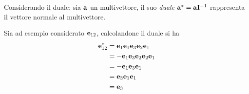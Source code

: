\begin{frame}
    Considerando il duale: sia \(\mathbf{a}\) un multivettore, 
    il suo \emph{duale} \(\mathbf{a}^{*} = \mathbf{a}\mathbf{I}^{-1}\) rappresenta il vettore normale al multivettore.

    Sia ad esempio considerato \(\mathbf{e}_{12}\), calcolandone il duale si ha
    \[\begin{aligned}
        \mathbf{e}_{12}^{*} & = \mathbf{e}_{1}\mathbf{e}_{1}\mathbf{e}_{3}\mathbf{e}_{2}\mathbf{e}_{1} \\ 
            & = - \mathbf{e}_{1}\mathbf{e}_{3}\mathbf{e}_{2}\mathbf{e}_{2}\mathbf{e}_{1} \\ 
            & = - \mathbf{e}_{1}\mathbf{e}_{3}\mathbf{e}_{1} \\ 
            & = \mathbf{e}_{3}\mathbf{e}_{1}\mathbf{e}_{1} \\ 
            & = \mathbf{e}_{3}
    \end{aligned}\]
\end{frame}
